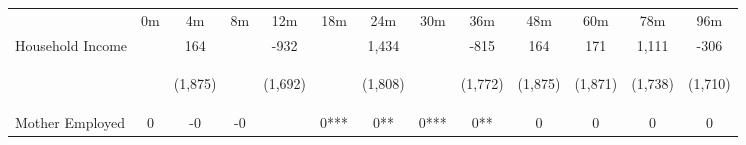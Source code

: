\begin{tabular}{lcccccccccccc}
\hline \noalign{\smallskip} & 0m & 4m & 8m & 12m & 18m & 24m & 30m & 36m & 48m & 60m & 78m & 96m\\
\noalign{\smallskip}\hline \noalign{\smallskip}Household Income &  & 164 &  & -932 &  & 1,434 &  & -815 & 164 & 171 & 1,111 & -306\\
 & \begin{footnotesize}\end{footnotesize} & \begin{footnotesize}(1,875)\end{footnotesize} & \begin{footnotesize}\end{footnotesize} & \begin{footnotesize}(1,692)\end{footnotesize} & \begin{footnotesize}\end{footnotesize} & \begin{footnotesize}(1,808)\end{footnotesize} & \begin{footnotesize}\end{footnotesize} & \begin{footnotesize}(1,772)\end{footnotesize} & \begin{footnotesize}(1,875)\end{footnotesize} & \begin{footnotesize}(1,871)\end{footnotesize} & \begin{footnotesize}(1,738)\end{footnotesize} & \begin{footnotesize}(1,710)\end{footnotesize}\\
\noalign{\smallskip}Mother Employed & 0 & -0 & -0 &  & 0*** & 0** & 0*** & 0** & 0 & 0 & 0 & 0\\

\end{tabular}
